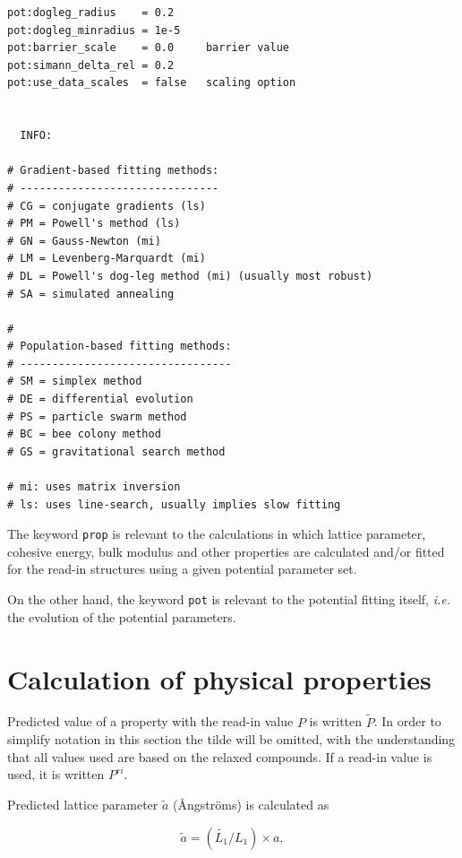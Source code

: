 \documentclass[a4paper,12pt,pdftex,onecolumn]{article}
\newcommand{\ie}{\emph{i.e.}\xspace}
\begin{document}
\begin{Verbatim}[fontsize=\relsize{-1},frame=single]
pot:dogleg_radius    = 0.2
pot:dogleg_minradius = 1e-5
pot:barrier_scale    = 0.0     barrier value
pot:simann_delta_rel = 0.2
pot:use_data_scales  = false   scaling option


  INFO:

# Gradient-based fitting methods:
# -------------------------------
# CG = conjugate gradients (ls)
# PM = Powell's method (ls)
# GN = Gauss-Newton (mi)
# LM = Levenberg-Marquardt (mi)
# DL = Powell's dog-leg method (mi) (usually most robust)
# SA = simulated annealing

#
# Population-based fitting methods:
# ---------------------------------
# SM = simplex method
# DE = differential evolution
# PS = particle swarm method
# BC = bee colony method
# GS = gravitational search method

# mi: uses matrix inversion
# ls: uses line-search, usually implies slow fitting

\end{Verbatim}



The keyword \verb+prop+ is relevant to the calculations in which
lattice parameter, cohesive energy, bulk modulus and other
properties are calculated and/or fitted for the read-in structures
using a given potential parameter set.

On the other hand, the keyword \verb+pot+ is relevant to the
potential fitting itself, \ie the evolution of the potential
parameters.










\section{Calculation of physical properties}


Predicted value of a property with the read-in value $P$ is written
$\widetilde{P}$. In order to simplify notation in this section the
tilde will be omitted, with the understanding that all values used
are based on the relaxed compounds. If a read-in value is used,
it is written $P^{ri}$.

Predicted lattice parameter $\widetilde{a}$ (\AA{}ngstr\"oms) is calculated as

\begin{equation}
\widetilde{a} = (\widetilde{L_1} / L_1) \times a,
\end{equation}
\end{document}
